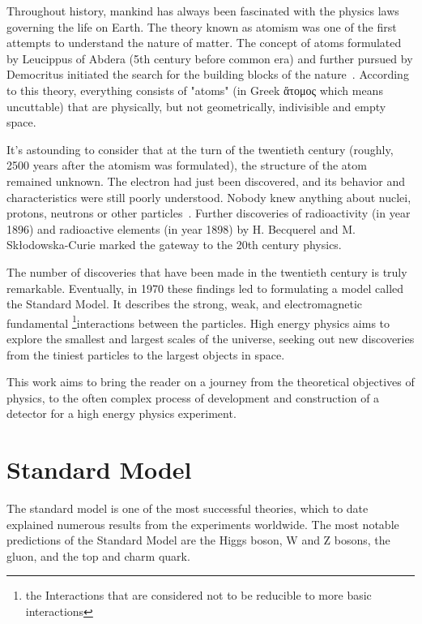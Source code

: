 Throughout history, mankind has always been fascinated with the physics laws governing the life on Earth. The theory known as atomism was one of the first attempts to understand the nature of matter. The concept of atoms formulated by Leucippus of Abdera (5th century before common era) and further pursued by Democritus initiated the search for the building blocks of the nature~\cite{sep-atomism-ancient}. According to this theory, everything consists of "atoms" (in Greek \foreignlanguage{greek}{ἄτομος} which means uncuttable) that are physically, but not geometrically, indivisible and empty space. 

It's astounding to consider that at the turn of the twentieth century (roughly, 2500 years after the atomism was formulated), the structure of the atom remained unknown. The electron had just been discovered, and its behavior and characteristics were still poorly understood. Nobody knew anything about nuclei, protons, neutrons or other particles~\cite{intro_particle_physics}. 
Further discoveries of radioactivity (in year 1896) and radioactive elements (in year 1898) by H. Becquerel and M. Skłodowska-Curie marked the gateway to the 20th century physics. 

The number of discoveries that have been made in the twentieth century is truly remarkable. Eventually, in 1970 these findings led to formulating a model called the Standard Model. It describes the strong, weak, and electromagnetic fundamental \footnote{the Interactions that are considered not to be reducible to more basic interactions}{interactions} between the particles. 
 High energy physics aims to explore the smallest and largest scales of the universe, seeking out new discoveries from the tiniest particles to the largest objects in space.
 
 This work aims to bring the reader on a journey from the theoretical objectives of physics, to the often complex process of development and construction of a detector for a high energy physics experiment.
 
\section{Standard Model}

The standard model is one of the most successful theories, which to date explained numerous results from the experiments worldwide. The most notable predictions of the Standard Model are the Higgs boson, W and Z bosons, the gluon, and the top and charm quark.

